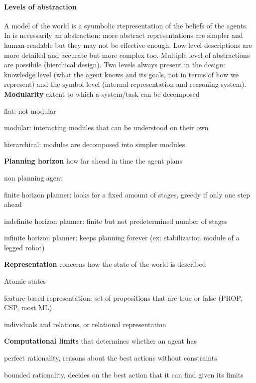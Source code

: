 \documentclass[10pt]{report}
\begin{document}
\paragraph{Levels of abstraction} A model of the world is a syumbolic rtepresentation of the beliefs of the agents. In is necessarily an abstraction: more abstract representations are simpler and human-readable but they may not be effective enough. Low level descriptions are more detailed and accurate but more complex too. Multiple level of abstractions are possibile (hierchical design). Two levels always present in the design: knowledge level (what the agent knows and its goals, not in terms of how we represent) and the symbol level (internal representation and reasoning system). \textbf{Modularity} extent to which a system/task can be decomposed \begin{list}{}{}
	\item flat: not modular
	\item modular: interacting modules that can be understood on their own
	\item hierarchical: modules are decomposed into simpler modules
\end{list}
\textbf{Planning horizon} how far ahead in time the agent plans \begin{list}{}{}
	\item non planning agent
	\item finite horizon planner: looks for a fixed amount of stages, greedy if only one step ahead
	\item indefinite horizon planner: finite but not predetermined number of stages
	\item infinite horizon planner: keeps planning forever (ex: stabilization module of a legged robot)
\end{list}
\textbf{Representation} concerns how the state of the world is described \begin{list}{}{}
	\item Atomic states
	\item feature-based representation: set of propositions that are true or false (PROP, CSP, most ML)
	\item individuals and relations, or relational representation
\end{list}
\textbf{Computational limits} that determines whether an agent has \begin{list}{}{}
	\item perfect rationality, reasons about the best actions without constraints
	\item bounded rationality, decides on the best action that it can find given its limits
\end{list}
\end{document}
